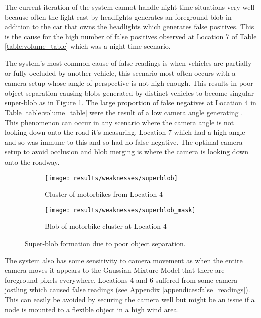 The current iteration of the system cannot handle night-time situations very well because often the light cast by headlights generates an foreground blob in addition to the car that owns the headlights which generates false positives. This is the cause for the high number of false positives observed at Location 7 of Table \ref{table:volume_table} which was a night-time scenario. 

The system's most common cause of false readings is when vehicles are partially or fully occluded by another vehicle, this scenario most often occurs with a camera setup whose angle of perspective is not high enough. This results in poor object separation causing blobs generated by distinct vehicles to become singular super-blob as in Figure \ref{fig:superblob}. The large proportion of false negatives at Location 4 in Table \ref{table:volume_table} were the result of a low camera angle generating . This phenomenon can occur in any scenario where the camera angle is not looking down onto the road it's measuring. Location 7 which had a high angle and so was immune to this and so had no false negative. The optimal camera setup to avoid occlusion and blob merging is where the camera is looking down onto the roadway.

\begin{figure}[H]
    \centering
     \begin{subfigure}[b]{0.45\textwidth}
        \texttt{[image: results/weaknesses/superblob]}
	\captionsetup{format = hang}
    \caption{Cluster of motorbikes from Location 4}
    \end{subfigure} 
    \begin{subfigure}[b]{0.45\textwidth}
        \texttt{[image: results/weaknesses/superblob\_mask]}	
	\captionsetup{format = hang}
    \caption{Blob of motorbike cluster at Location 4}
    \end{subfigure}
    \captionsetup{format = hang}
    \caption{Super-blob formation due to poor object separation.}
    \label{fig:superblob}
\end{figure}

The system also has some sensitivity to camera movement as when the entire camera moves it appears to the Gaussian Mixture Model that there are foreground pixels everywhere. Locations 4 and 6 suffered from some camera jostling which caused false readings (see Appendix \ref{appendices:false_readings}). This can easily be avoided by securing the camera well but might be an issue if a node is mounted to a flexible object in a high wind area.

